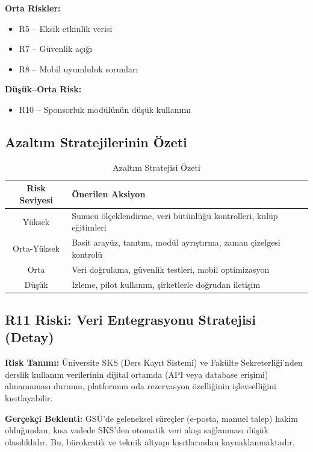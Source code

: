 \documentclass[a4paper,12pt]{report}
\begin{document}
\textbf{Orta Riskler:}
\begin{itemize}
    \item R5 – Eksik etkinlik verisi
    \item R7 – Güvenlik açığı
    \item R8 – Mobil uyumluluk sorunları
\end{itemize}

\textbf{Düşük–Orta Risk:}
\begin{itemize}
    \item R10 – Sponsorluk modülünün düşük kullanımı
\end{itemize}

\subsection{Azaltım Stratejilerinin Özeti}

\begin{table}[H]
\centering
\caption{Azaltım Stratejisi Özeti}
\begin{tabular}{c p{10cm}}
\toprule
\textbf{Risk Seviyesi} & \textbf{Önerilen Aksiyon} \\
\midrule
Yüksek & Sunucu ölçeklendirme, veri bütünlüğü kontrolleri, kulüp eğitimleri \\
Orta-Yüksek & Basit arayüz, tanıtım, modül ayrıştırma, zaman çizelgesi kontrolü \\
Orta & Veri doğrulama, güvenlik testleri, mobil optimizasyon \\
Düşük & İzleme, pilot kullanım, şirketlerle doğrudan iletişim \\
\bottomrule
\end{tabular}
\end{table}

\subsection{R11 Riski: Veri Entegrasyonu Stratejisi (Detay)}

\textbf{Risk Tanımı:} Üniversite SKS (Ders Kayıt Sistemi) ve Fakülte Sekreterliği'nden derslik kullanım verilerinin dijital ortamda (API veya database erişimi) alınamaması durumu, platformun oda rezervasyon özelliğinin işlevselliğini kısıtlayabilir.

\textbf{Gerçekçi Beklenti:} GSÜ'de geleneksel süreçler (e-posta, manuel talep) hakim olduğundan, kısa vadede SKS'den otomatik veri akışı sağlanması düşük olasılıklıdır. Bu, bürokratik ve teknik altyapı kısıtlarından kaynaklanmaktadır.
\end{document}
